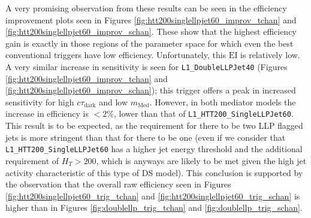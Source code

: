 A very promising observation from these results can be seen in the efficiency improvement plots seen in Figures \ref{fig:htt200singlellpjet60_improv_tchan} and \ref{fig:htt200singlellpjet60_improv_schan}. These show that the highest efficiency gain is exactly in those regions of the parameter space for which even the best conventional triggers have low efficiency. Unfortunately, this $\text{EI}$ is relatively low. A very similar increase in sensitivity is seen for \texttt{L1\_DoubleLLPJet40} (Figures \ref{fig:htt200singlellpjet60_improv_tchan} and \ref{fig:htt200singlellpjet60_improv_schan}); this trigger offers a peak in increased sensitivity for high $c\tau_{\text{dark}}$ and low $m_{\text{Med}}$. However, in both mediator models the increase in efficiency is $<2\%$, lower than that of \texttt{L1\_HTT200\_SingleLLPJet60}. This result is to be expected, as the requirement for there to be two LLP flagged jets is more stringent than that for there to be one (even if we consider that \texttt{L1\_HTT200\_SingleLLPJet60} has a higher jet energy threshold and the additional requirement of $H_T>200$, which is anyways are likely to be met given the high jet activity characteristic of this type of DS model). This conclusion is supported by the observation that the overall raw efficiency seen in Figures \ref{fig:htt200singlellpjet60_trig_tchan} and \ref{fig:htt200singlellpjet60_trig_schan} is higher than in Figures \ref{fig:doublellp_trig_tchan} and \ref{fig:doublellp_trig_schan}.

